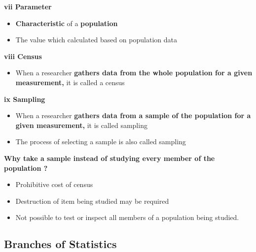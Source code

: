 \documentclass[]{book}
\providecommand{\tightlist}{%
  \setlength{\itemsep}{0pt}\setlength{\parskip}{0pt}}
\begin{document}
\textbf{vii Parameter}

\begin{itemize}
\tightlist
\item
  \textbf{Characteristic} of a \textbf{population}
\item
  The value which calculated based on population data
\end{itemize}

\textbf{viii Census}

\begin{itemize}
\tightlist
\item
  When a researcher \textbf{gathers data from the whole population for a given measurement,} it is called a census
\end{itemize}

\textbf{ix Sampling}

\begin{itemize}
\tightlist
\item
  When a researcher \textbf{gathers data from a sample of the population for a given measurement,} it is called sampling
\item
  The process of selecting a sample is also called sampling
\end{itemize}

\textbf{Why take a sample instead of studying every member of the population ?}

\begin{itemize}
\tightlist
\item
  Prohibitive cost of census
\item
  Destruction of item being studied may be required
\item
  Not possible to test or inspect all members of a population being studied.
\end{itemize}

\hypertarget{branches-of-statistics}{%
\subsection{Branches of Statistics}\label{branches-of-statistics}}
\end{document}
